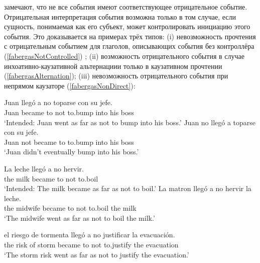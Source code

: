 \documentclass[a4paper, titlepage]{article}
\begin{document}
\citep{fabergas2017building} замечают, что не все события имеют соответствующее отрицательное событие. Отрицательная интерпретация события возможна только в том случае, если сущность, понимаемая как его субъект, может контролировать инициацию этого события. Это доказывается на примерах трёх типов: (i) невозможность прочтения с отрицательным событием для глаголов, описывающих события без контроллёра (\ref{fabergasNotControlled}) ; (ii) возможность отрицательного события в случае инхоативно-каузативной альтернациии только в каузативном прочтении (\ref{fabergasAlternation}); (iii) невозможность отрицательного события при непрямом каузаторе (\ref{fabergasNonDirect}):

\begin{exe}
    \ex \begin{xlist}
        \ex \label{fabergasNotControlled} 
            \gll *Juan llegó a no toparse con su jefe. \\
                 Juan became to not to.bump into his boss \\
            \glt `Intended: Juan went as far as not to bump into his boss.'
        \ex
            \gll Juan no llegó a toparse con su jefe. \\
                 Juan not became to to.bump into his boss \\
            \glt `Juan didn’t eventually bump into his boss.'
    \end{xlist}
\end{exe}

\begin{exe}
    \ex \begin{xlist}
        \ex 
            \gll *La leche llegó a no hervir. \\
                 the milk became to not to.boil \\
            \glt `Intended: The milk became as far as not to boil.'
        \ex \label{fabergasAlternation} 
            \gll La matron llegó a no hervir la leche. \\
                 the midwife became to not to.boil the milk \\
            \glt `The midwife went as far as not to boil the milk.'
    \end{xlist}
\end{exe}

\begin{exe}
     \label{fabergasNonDirect} 
        \gll *el riesgo de tormenta llegó a no justificar la evacuación. \\
             the risk of storm became to not to.justify the evacuation \\
        \glt `The storm risk went as far as not to justify the evacuation.'
\end{exe}
\end{document}
